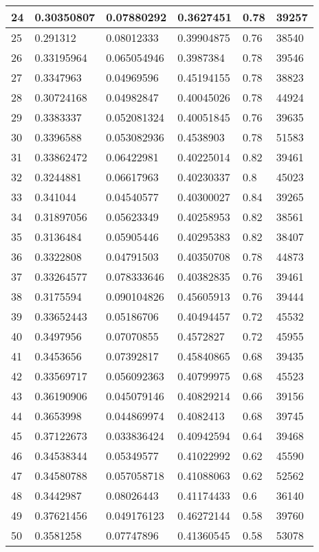 \begin{longtable}{|l|l|l|l|l|l|}
24 & 0.30350807 & 0.07880292 & 0.3627451 & 0.78 & 39257 \\ \hline 
25 & 0.291312 & 0.08012333 & 0.39904875 & 0.76 & 38540 \\ \hline 
26 & 0.33195964 & 0.065054946 & 0.3987384 & 0.78 & 39546 \\ \hline 
27 & 0.3347963 & 0.04969596 & 0.45194155 & 0.78 & 38823 \\ \hline 
28 & 0.30724168 & 0.04982847 & 0.40045026 & 0.78 & 44924 \\ \hline 
29 & 0.3383337 & 0.052081324 & 0.40051845 & 0.76 & 39635 \\ \hline 
30 & 0.3396588 & 0.053082936 & 0.4538903 & 0.78 & 51583 \\ \hline 
31 & 0.33862472 & 0.06422981 & 0.40225014 & 0.82 & 39461 \\ \hline 
32 & 0.3244881 & 0.06617963 & 0.40230337 & 0.8 & 45023 \\ \hline 
33 & 0.341044 & 0.04540577 & 0.40300027 & 0.84 & 39265 \\ \hline 
34 & 0.31897056 & 0.05623349 & 0.40258953 & 0.82 & 38561 \\ \hline 
35 & 0.3136484 & 0.05905446 & 0.40295383 & 0.82 & 38407 \\ \hline 
36 & 0.3322808 & 0.04791503 & 0.40350708 & 0.78 & 44873 \\ \hline 
37 & 0.33264577 & 0.078333646 & 0.40382835 & 0.76 & 39461 \\ \hline 
38 & 0.3175594 & 0.090104826 & 0.45605913 & 0.76 & 39444 \\ \hline 
39 & 0.33652443 & 0.05186706 & 0.40494457 & 0.72 & 45532 \\ \hline 
40 & 0.3497956 & 0.07070855 & 0.4572827 & 0.72 & 45955 \\ \hline 
41 & 0.3453656 & 0.07392817 & 0.45840865 & 0.68 & 39435 \\ \hline 
42 & 0.33569717 & 0.056092363 & 0.40799975 & 0.68 & 45523 \\ \hline 
43 & 0.36190906 & 0.045079146 & 0.40829214 & 0.66 & 39156 \\ \hline 
44 & 0.3653998 & 0.044869974 & 0.4082413 & 0.68 & 39745 \\ \hline 
45 & 0.37122673 & 0.033836424 & 0.40942594 & 0.64 & 39468 \\ \hline 
46 & 0.34538344 & 0.05349577 & 0.41022992 & 0.62 & 45590 \\ \hline 
47 & 0.34580788 & 0.057058718 & 0.41088063 & 0.62 & 52562 \\ \hline 
48 & 0.3442987 & 0.08026443 & 0.41174433 & 0.6 & 36140 \\ \hline 
49 & 0.37621456 & 0.049176123 & 0.46272144 & 0.58 & 39760 \\ \hline 
50 & 0.3581258 & 0.07747896 & 0.41360545 & 0.58 & 53078 \\ \hline 
\end{longtable}